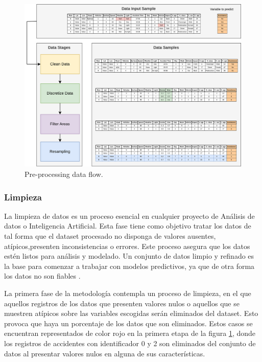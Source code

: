 \documentclass{uathesis-es}
\begin{document}
{	\begin{figure}[H]
		\centering
		\includegraphics[width=17cm]{Figures/Preprocessing.png}
		\caption{Pre-processing data flow.}
		\label{PreprocessingStage}
	\end{figure}
	
	
	\subsubsection{Limpieza}
	
	La limpieza de datos es un proceso esencial en cualquier proyecto de Análisis de datos o Inteligencia Artificial. Esta fase tiene como objetivo tratar los datos de tal forma que el dataset procesado no disponga de valores ausentes, atípicos,presenten inconsistencias o errores. Este proceso asegura que los datos estén listos para análisis y modelado. Un conjunto de datos limpio y refinado es la base para comenzar a trabajar con modelos predictivos, ya que de otra forma los datos no son fiables \cite{ilyas2019data}.
	
	
	La primera fase de la metodología contempla un proceso de limpieza, en el que aquellos registros de los datos que presenten valores nulos o aquellos que se muestren atípicos sobre las variables escogidas serán eliminados del dataset. Esto provoca que haya un porcentaje de los datos que son eliminados. Estos casos se encuentran representados de color rojo en la primera etapa de la figura \ref{PreprocessingStage}, donde los registros de accidentes con identificador 0 y 2 son eliminados del conjunto de datos al presentar valores nulos en alguna de sus características.
	
}
\end{document}
